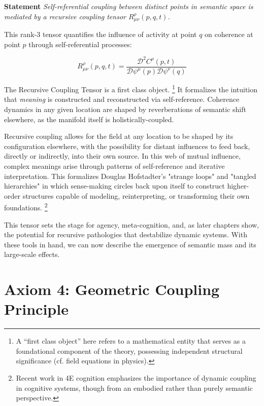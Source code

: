 \textbf{Statement} \textit{Self-referential coupling between distinct points in semantic space is mediated by a recursive coupling tensor \(R^\rho_{\mu\nu}(p,q,t)\).}

This rank-3 tensor quantifies the influence of activity at point \(q\) on coherence at point \(p\) through self-referential processes:

\begin{equation}
R^\rho_{\mu\nu}(p,q,t) = \frac{\mathcal{D}^2 C^\rho(p,t)}{\mathcal{D} \psi^\mu(p) \mathcal{D} \psi^\nu(q)}
\end{equation}

The Recursive Coupling Tensor is a first class object. \footnote{A “first class object” here refers to a mathematical entity that serves as a foundational component of the theory, possessing independent structural significance (cf. field equations in physics).} It formalizes the intuition that \textit{meaning} is constructed and reconstructed via self-reference. Coherence dynamics in any given location are shaped by reverberations of semantic shift elsewhere, as the manifold itself is holistically-coupled.

Recursive coupling allows for the field at any location to be shaped by its configuration elsewhere, with the possibility for distant influences to feed back, directly or indirectly, into their own source. In this web of mutual influence, complex meanings arise through patterns of self-reference and iterative interpretation. This formalizes Douglas Hofstadter's "strange loops" and "tangled hierarchies" \autocite{Hofstadter1979, Hofstadter2007} in which sense-making circles back upon itself to construct higher-order structures capable of modeling, reinterpreting, or transforming their own foundations. \footnote{Recent work in 4E cognition \autocite{Newen2018, Gallagher2020} emphasizes the importance of dynamic coupling in cognitive systems, though from an embodied rather than purely semantic perspective.}

This tensor sets the stage for agency, meta-cognition, and, as later chapters show, the potential for recursive pathologies that destabilize dynamic systems. With these tools in hand, we can now describe the emergence of semantic mass and its large-scale effects.


\section{Axiom 4: Geometric Coupling Principle}
\label{1.4:axiom_4_geometric_coupling_principle}

